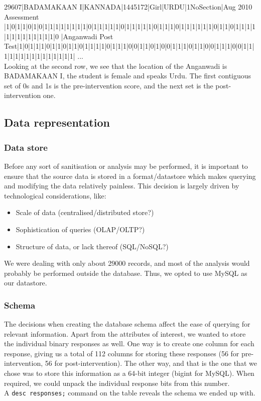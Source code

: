 \documentclass[10pt]{article}
\begin{document}
{\footnotesize 29607|BADAMAKAAN I|KANNADA|1445172|Girl|URDU|1NoSection|Aug 2010 Assessment
|1|0|1|1|0|1|0|1|1|1|1|1|1|1|1|0|1|1|1|1|1|0|1|1|1|1|1|0|1|1|1|0|1|1|1|1|1|1|0|1|1|0|1|1|1|1|1|1|1|1|1|1|1|1|1|0
|Anganwadi Post Test|1|0|1|1|1|0|1|1|0|1|1|0|1|1|1|1|0|1|1|1|0|0|1|1|0|1|0|0|1|1|1|0|1|1|0|0|1|1|1|0|0|1|1|1|1|1|1|1|1|1|1|1|1|1|1|1|
...
}\\

Looking at the second row, we see that the location of the Anganwadi is BADAMAKAAN I, the student is female and speaks Urdu. The first contiguous set of 0s and 1s is the pre-intervention score, and the next set is the post-intervention one.

\newpage
\subsection{Data representation}
\subsubsection{Data store}
Before any sort of sanitisation or analysis may be performed, it is important to ensure that the source data is stored in a format/datastore which makes querying and modifying the data relatively painless. This decision is largely driven by technological considerations, like:

\begin{itemize}
\item Scale of data (centralised/distributed store?)
\item Sophistication of queries (OLAP/OLTP?)
\item Structure of data, or lack thereof (SQL/NoSQL?)
\end{itemize}

We were dealing with only about 29000 records, and most of the analysis would probably be performed outside the database. Thus, we opted to use MySQL as our datastore.

\newpage
\subsubsection{Schema}
The decisions when creating the database schema affect the ease of querying for relevant information. Apart from the attributes of interest, we wanted to store the individual binary responses as well. One way is to create one column for each response, giving us a total of 112 columns for storing these responses (56 for pre-intervention, 56 for post-intervention). The other way, and that is the one that we chose was to store this information as a 64-bit integer (bigint for MySQL). When required, we could unpack the individual response bits from this number.\\
A {\tt desc responses;} command on the table reveals the schema we ended up with.
\end{document}
